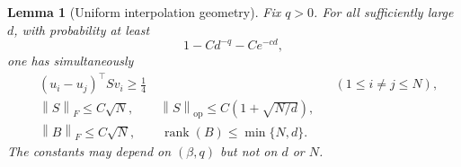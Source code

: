 \documentclass[11pt]{article}
\newtheorem{lemma}[lemma]{Lemma}
\theoremstyle{definition}
\newcommand{\normF}[1]{\left\lVert #1\right\rVert_F}
\newcommand{\normop}[1]{\left\lVert #1\right\rVert_{\mathrm{op}}}
\begin{document}
\begin{lemma}[Uniform interpolation geometry]
\label{lem:subquadratic-geometry}
Fix $q>0$.  For all sufficiently large $d$, with probability at least
\begin{equation}
 1-Cd^{-q}-Ce^{-cd},
 \label{eq:subquadratic-geometry-prob}
\end{equation}
one has simultaneously
\begin{align}
 &(u_i-u_j)^\top Sv_i\geq\frac14
 &&(1\leq i\neq j\leq N),
 \label{eq:subquadratic-margin}\\
 &\normF{S}\leq C\sqrt N,
 \qquad
 \normop{S}\leq C\left(1+\sqrt{N/d}\right),
 \label{eq:subquadratic-S-norms}\\
 &\normF{B}\leq C\sqrt N,
 \qquad
 \operatorname{rank}(B)\leq\min\{N,d\}.
 \label{eq:subquadratic-B-norms}
\end{align}
The constants may depend on $(\beta,q)$ but not on $d$ or $N$.
\end{lemma}
\end{document}
